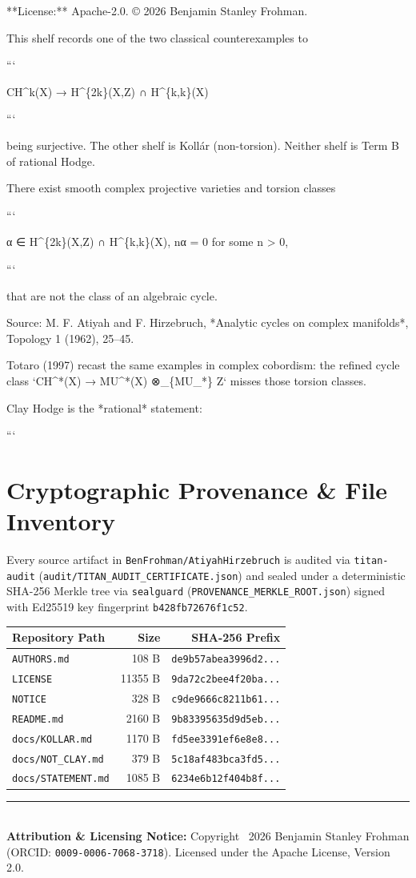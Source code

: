 \documentclass[11pt,a4paper]{article}
\begin{document}
**License:** Apache-2.0. © 2026 Benjamin Stanley Frohman.

This shelf records one of the two classical counterexamples to

```

CH\textasciicircum{}k(X) → H\textasciicircum{}\{2k\}(X,Z) ∩ H\textasciicircum{}\{k,k\}(X)

```

being surjective. The other shelf is Kollár (non-torsion). Neither shelf is Term B of rational Hodge.

There exist smooth complex projective varieties and torsion classes

```

α ∈ H\textasciicircum{}\{2k\}(X,Z) ∩ H\textasciicircum{}\{k,k\}(X),    nα = 0 for some n > 0,

```

that are not the class of an algebraic cycle.

Source: M. F. Atiyah and F. Hirzebruch, *Analytic cycles on complex manifolds*, Topology 1 (1962), 25–45.

Totaro (1997) recast the same examples in complex cobordism: the refined cycle class `CH\textasciicircum{}*(X) → MU\textasciicircum{}*(X) ⊗\_\{MU\_*\} Z` misses those torsion classes.

Clay Hodge is the *rational* statement:

```

\section{Cryptographic Provenance \& File Inventory}
Every source artifact in \texttt{BenFrohman/AtiyahHirzebruch} is audited via \texttt{titan-audit}
(\texttt{audit/TITAN\_AUDIT\_CERTIFICATE.json}) and sealed under a deterministic SHA-256 Merkle tree via
\texttt{sealguard} (\texttt{PROVENANCE\_MERKLE\_ROOT.json}) signed with Ed25519 key fingerprint
\texttt{b428fb72676f1c52}.

\begin{center}
\small
\begin{tabular}{p{}rr}
\toprule
\textbf{Repository Path} & \textbf{Size} & \textbf{SHA-256 Prefix} \\
\midrule
\texttt{AUTHORS.md} & 108 B & \texttt{de9b57abea3996d2...} \\
\texttt{LICENSE} & 11355 B & \texttt{9da72c2bee4f20ba...} \\
\texttt{NOTICE} & 328 B & \texttt{c9de9666c8211b61...} \\
\texttt{README.md} & 2160 B & \texttt{9b83395635d9d5eb...} \\
\texttt{docs/KOLLAR.md} & 1170 B & \texttt{fd5ee3391ef6e8e8...} \\
\texttt{docs/NOT\_CLAY.md} & 379 B & \texttt{5c18af483bca3fd5...} \\
\texttt{docs/STATEMENT.md} & 1085 B & \texttt{6234e6b12f404b8f...} \\
\bottomrule
\end{tabular}
\end{center}

\vfill
\noindent\rule{\textwidth}{0.4pt}\\
\footnotesize
\textbf{Attribution \& Licensing Notice:} Copyright \textcopyright\ 2026 Benjamin Stanley Frohman (ORCID: \texttt{0009-0006-7068-3718}).
Licensed under the Apache License, Version 2.0.
\end{document}
